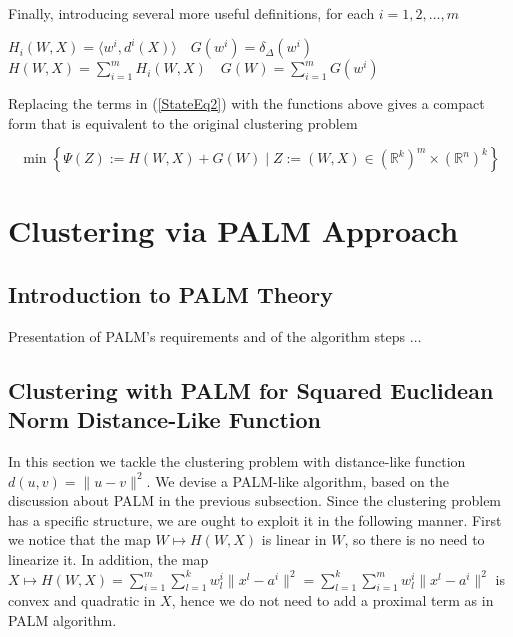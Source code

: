 \documentclass[11pt]{article}
\numberwithin{equation}{section}
\begin{document}
Finally, introducing several more useful definitions, for each $i=1, 2, \ldots , m$

\begin{center}
$H_i(W,X) = \langle w^i , d^i(X) \rangle \quad G(w^i) = \delta_{\Delta}(w^i)$
\\ \smallskip
$H(W,X) = \sum\limits_{i=1}^{m} H_i(W,X)\quad G(W) = \sum\limits_{i=1}^{m} G(w^i)$
\\
\end{center}

Replacing the terms in (\ref{StateEq2}) with the functions above gives a compact form that is equivalent to the original clustering problem

\begin{equation}
	\min \left\lbrace \Psi(Z) := H(W,X) + G(W) \mid Z := (W,X) \in (\mathbb{R}^k)^m \times (\mathbb{R}^n)^k \right\rbrace \label{StateEq4}
\end{equation}


\section{Clustering via PALM Approach}

\subsection{Introduction to PALM Theory}

Presentation of PALM's requirements and of the algorithm steps  $\ldots$

\subsection{Clustering with PALM for Squared Euclidean Norm Distance-Like Function}

In this section we tackle the clustering problem with distance-like function $d(u,v) = \|u-v\|^2$. We devise a PALM-like algorithm, based on the discussion about PALM in the previous subsection.
Since the clustering problem has a specific structure, we are ought to exploit it in the following manner.
First we notice that the map 
$W \mapsto H(W,X)$ is linear in $W$, so there is no need to linearize it. In addition, the map 
$X \mapsto H(W,X) = 
\sum\limits_{i=1}^{m} \sum\limits_{l=1}^{k} w^i_l \|x^l - a^i\|^2 =
\sum\limits_{l=1}^{k} \sum\limits_{i=1}^{m} w^i_l \|x^l - a^i\|^2$ is convex and quadratic in $X$, hence we do not need to add a proximal term as in PALM algorithm.
\end{document}
